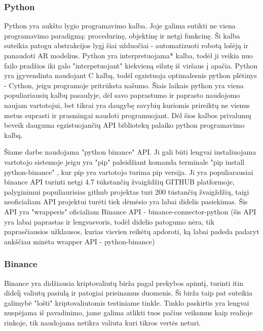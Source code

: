 \documentclass{VUMIFInfKursinis}
\begin{document}
\subsubsection{Python}
Python yra aukšto lygio programavimo kalba. Joje galima sutikti ne viena programavimo paradigmą: procedurinę, objektinę ir netgi funkcinę.
Ši kalba suteikia patogu abstrakcijos lygį šiai užduočiai - automatizuoti robotą lošėją ir panaudoti AR modelius.
Python yra interpretuojama* kalba, todėl ji veikia nuo failo pradžios iki galo "interpetuojant" kiekvieną eilutę iš viršaus į apačia. %
Python yra įgyvendinta naudojant C kalbą, todėl egzistuoja optimalesnis python plėtinys - Cython, jeigu programoje pritrūksta našumo. Šiais laikais
python yra viena populiariausių kalbų pasaulyje, dėl savo paprastumo ir paprasto naudojomo naujam vartotojui, bet tikrai yra daugybę savybių
kuriomis prireiktų ne vienus metus suprasti ir prasmingai naudoti programuojant. Dėl šios kalbos privalumų beveik dauguma egzistuojančių API
bibliotekų palaiko python programavimo kalbą.


Šiame darbe naudojama "python binance" API. Ji gali būti lengvai instaliuojama vartotojo sistemoje jeigu yra "pip" paleidžiant komanda terminale "pip install python-binance"
, kur pip yra vartotojo turima pip versija. Ji yra populiarausiai binance API turinti netgi 4.7 tūkstančių žvaigždžių GITHUB platformoje\cite{DokTest}, palyginimui populiaurisias github projektas turi
200 tūstančių žvaigždžių, taigi neoficialiam API projektui turėti tiek dėmėsio yra labai didelis pasiekimas. Šis API yra "wrapperis" oficialiam Binance 
API - binance-connector-python (šis API yra labai paprastas ir lengvasvoris, todėl didelio patogumo nėra, tik paprasčiausios užklausos, kurias visvien
reikėtų apdoroti, ką labai padeda padaryt ankščiau minėta wrapper API - python-binance)  

\subsubsection{Binance}
Binance yra didžiausia kriptovaliutų birža pagal prekybos apimtį, turinti itin didelį valiutų pasiulą ir patogiai prieinamus duomenis. Ši birža taip pat
suteikia galimybė "lošti" kriptovaliutomis testiniame tinkle. Tinklo paskirtis yra lengvai nuspėjama iš pavadinimo, jame galima atlikti tuos pačius 
veiksmus kaip realioje rinkoje, tik naudojama netikra valiuta kuri tikros vertės neturi. 
\end{document}
